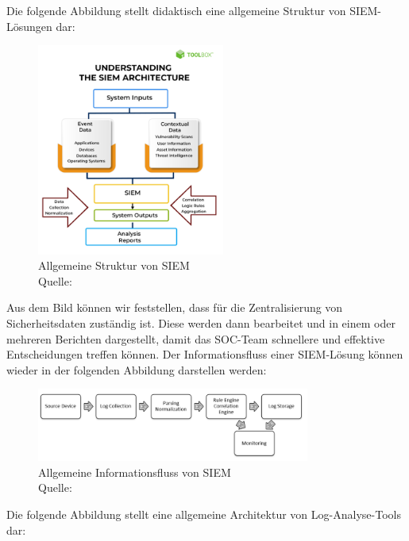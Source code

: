 Die folgende Abbildung stellt didaktisch eine allgemeine Struktur von \gls{SIEM}-Lösungen dar:

\begin{figure}[H]
   \centering
   \includegraphics[width=0.55\textwidth]{assets/2_p1.png}
   \caption[Allgemeine Struktur von \gls{SIEM}]
   {Allgemeine Struktur von \gls{SIEM}\\Quelle: \citep{Mohanan_What} }
   \label{fig:SIEM_Allg_Struktur}
   \centering
\end{figure}

\newpage
Aus dem Bild können wir feststellen, dass  für die Zentralisierung von Sicherheitsdaten zuständig ist. Diese werden dann bearbeitet und in einem oder mehreren Berichten dargestellt, damit das \gls{SOC}-Team schnellere und effektive Entscheidungen treffen können. Der Informationsfluss einer \gls{SIEM}-Lösung können wieder in der folgenden Abbildung darstellen werden:

\begin{figure}[H]
   \centering
   \includegraphics[width=0.8\textwidth]{assets/2_p2.png}
   \caption[Allgemeine Informationsfluss von \gls{SIEM}]
   {Allgemeine Informationsfluss von \gls{SIEM} \\Quelle: \citep{Granadillo_SIEM} }
   \label{fig:SIEM_Allg_Informationsfluss}
   \centering
\end{figure}

Die folgende Abbildung stellt eine allgemeine Architektur von Log-Analyse-Tools dar:


